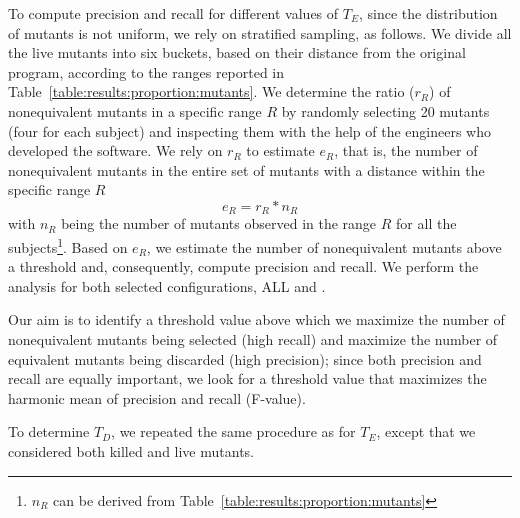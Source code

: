 To compute precision and recall for different values of $T_E$, since the distribution of mutants is not uniform, we rely on stratified sampling, as follows.
We divide all the live mutants into six buckets, based on their distance from the original program, according to the ranges reported in Table~\ref{table:results:proportion:mutants}.
We determine the ratio ($r_R$) of nonequivalent mutants in a specific range $R$ by randomly selecting 20 mutants (four for each subject) and inspecting them with the help of the engineers who developed the software.
We rely on $r_R$ to estimate $e_{R}$, that is, the number of nonequivalent mutants in the entire set of mutants with a distance within the specific  range $R$
$$e_R = r_R * n_R$$
with $n_R$ being the number of mutants observed in the range $R$ for all the subjects\footnote{$n_R$ can be derived from Table~\ref{table:results:proportion:mutants}}.
Based on $e_R$, we estimate the number of nonequivalent mutants above a threshold and, consequently, compute precision and recall. We perform the analysis for both selected configurations,  ALL and \APPR.

Our aim is to identify a threshold value above which  we
maximize the number of nonequivalent mutants being selected (high recall) and maximize the number of equivalent mutants being discarded (high precision); since both precision and recall are equally important, we look for a threshold value that maximizes the harmonic mean of precision and recall (F-value).

To determine $T_D$, we repeated the same procedure as for $T_E$, except that we considered both killed and live mutants.


